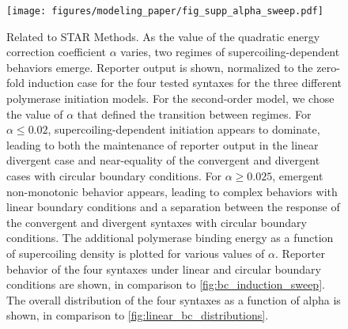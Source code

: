 \documentclass[11pt]{article} %
\begin{document}
\begin{figure}[htbp]
    \centering
    {\texttt{[image: figures/modeling\_paper/fig\_supp\_alpha\_sweep.pdf]}
    \label{fig:supp:initation_order_comparison}
    \label{fig:supp:alpha_reporter_counts}
    \label{fig:supp_alpha_sweep_induction}
    \label{fig:supp_alpha_sweep_energy}
    \label{fig:supp_alpha_sweep_linear}
    \label{fig:supp_alpha_sweep_circular}
    \label{fig:supp_alpha_sweep_distribution}
    }
\end{figure}
\begin{figure}[htbp]
    \ContinuedFloat
    \caption{Related to STAR Methods.
    As the value of the quadratic energy correction coefficient \(\alpha\) varies, two regimes of supercoiling-dependent behaviors emerge.
         Reporter output is shown, normalized to the zero-fold induction case for the four tested syntaxes for the three different polymerase initiation models.
         For the second-order model, we chose the value of \(\alpha\) that defined the transition between regimes.
         For \(\alpha \leq 0.02\), supercoiling-dependent initiation appears to dominate, leading to both the maintenance of reporter output in the linear divergent case and near-equality of the convergent and divergent cases with circular boundary conditions. For \(\alpha \geq 0.025\), emergent non-monotonic behavior appears, leading to complex behaviors with linear boundary conditions and a separation between the response of the convergent and divergent syntaxes with circular boundary conditions.
         The additional polymerase binding energy as a function of supercoiling density is plotted for various values of \(\alpha\).
          Reporter behavior of the four syntaxes under linear and circular boundary conditions are shown, in comparison to \cref{fig:bc_induction_sweep}.
         The overall distribution of the four syntaxes as a function of alpha is shown, in comparison to \cref{fig:linear_bc_distributions}.
    }
    \label{fig:top:alpha_sweep}
\end{figure}
\FloatBarrier
\end{document}
